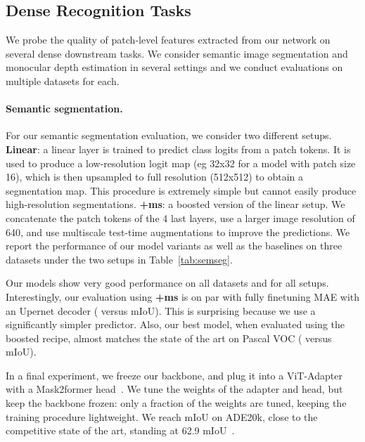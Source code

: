 \subsection{Dense Recognition Tasks}
We probe the quality of patch-level features extracted from our network on several dense downstream tasks.
We consider semantic image segmentation and monocular depth estimation in several settings and we conduct evaluations on multiple datasets for each.

\paragraph{Semantic segmentation.}
For our semantic segmentation evaluation, we consider two different setups.
\textbf{Linear}: a linear layer is trained to predict class logits from a patch tokens. 
It is used to produce a low-resolution logit map (eg 32x32 for a model with patch size 16), which is then upsampled to full resolution (512x512) to obtain a segmentation map. 
This procedure is extremely simple but cannot easily produce high-resolution segmentations.
\textbf{+ms}: a boosted version of the linear setup. 
We concatenate the patch tokens of the 4 last layers, use a larger image  resolution of 640, and use multiscale test-time augmentations to improve the predictions. 
We report the performance of our model variants as well as the baselines on three datasets under the two setups in Table~\ref{tab:semseg}.

Our models show very good performance on all datasets and for all setups. 
Interestingly, our evaluation using \textbf{+ms} is on par with fully finetuning MAE with an Upernet decoder ( versus  mIoU).
This is surprising because we use a significantly simpler predictor.
Also, our best model, when evaluated using the boosted recipe, almost matches the state of the art on Pascal VOC ( versus  mIoU).

In a final experiment, we freeze our backbone, and plug it into a ViT-Adapter \cite{chen2022vision} with a Mask2former head~\citep{cheng2022masked}. 
We tune the weights of the adapter and head, but keep the backbone frozen: 
only a fraction of the weights are tuned, keeping the training procedure lightweight. 
We reach  mIoU on ADE20k, close to the competitive state of the art, standing at 62.9 mIoU~\citep{wang2022internimage}.


